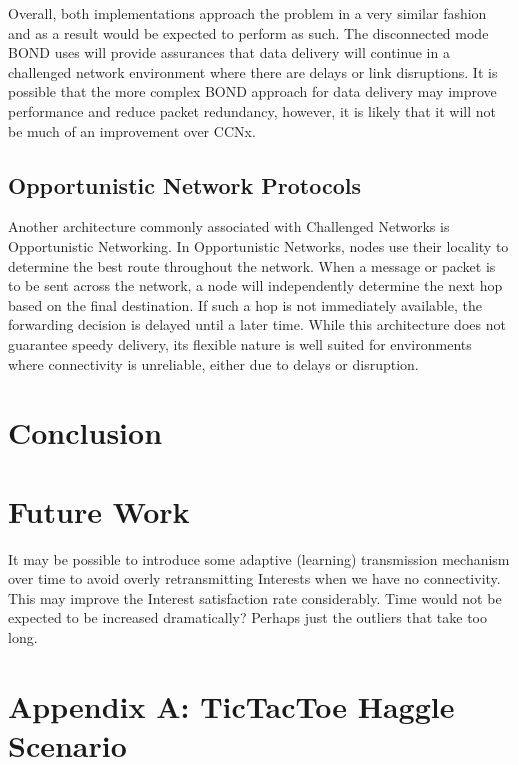 \documentclass[a4paper,12pt]{report}      %
\begin{document}
Overall, both implementations approach the problem in a very similar fashion and as a result
would be expected to perform as such. The disconnected mode BOND uses will provide assurances
that data delivery will continue in a challenged network environment where there are delays or link
disruptions. It is possible that the more complex BOND approach for data delivery may improve
performance and reduce packet redundancy, however, it is likely that it will not be much of an
improvement over CCNx.

\section{Opportunistic Network Protocols}

Another architecture commonly associated with Challenged Networks is Opportunistic Networking. In
Opportunistic Networks, nodes use their locality to determine the best route throughout the network.
When a message or packet is to be sent across the network, a node will independently determine the
next hop based on the final destination. If such a hop is not immediately available, the forwarding
decision is delayed until a later time. While this architecture does not guarantee speedy delivery, its
flexible nature is well suited for environments where connectivity is unreliable, either due to delays or
disruption.\cite{oppnets}

\pagebreak
\chapter{Conclusion}

\pagebreak
\chapter{Future Work}

It may be possible to introduce some adaptive (learning) transmission mechanism over time to avoid
overly retransmitting Interests when we have no connectivity. This may improve the Interest
satisfaction rate considerably. Time would not be expected to be increased dramatically? Perhaps just
the outliers that take too long.

\pagebreak
{}


\pagebreak
\chapter*{Appendix A: TicTacToe Haggle Scenario}
\end{document}
